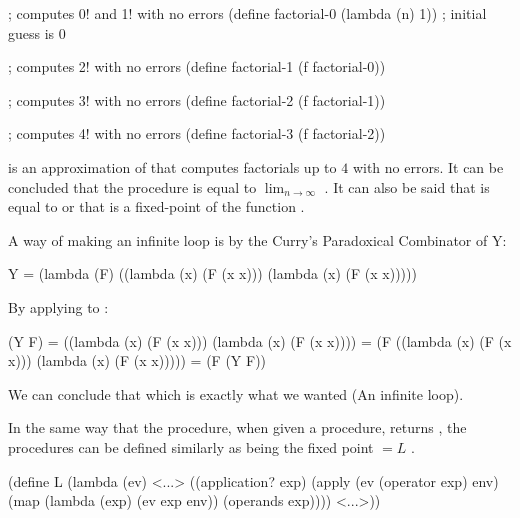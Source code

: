   \begin{code}
; computes 0! and 1! with no errors
(define factorial-0 (lambda (n) 1)) ; initial guess is 0

; computes 2! with no errors
(define factorial-1 (f factorial-0))

; computes 3! with no errors
(define factorial-2 (f factorial-1))

; computes 4! with no errors
(define factorial-3 (f factorial-2))
  \end{code}

   is an approximation of  that computes factorials up to $4$ with no errors. It can be concluded that the procedure  is equal to $\lim_{n \to \infty}$ . It can also be said that  is equal to  or that  is a fixed-point of the function .

  A way of making an infinite loop is by the Curry's Paradoxical Combinator of Y:

  \begin{code}
Y = (lambda (F)
      ((lambda (x) (F (x x)))
       (lambda (x) (F (x x)))))
  \end{code}

  By applying  to :

  \begin{code}
(Y F) = ((lambda (x) (F (x x)))
         (lambda (x) (F (x x))))
      = (F ((lambda (x) (F (x x)))
            (lambda (x) (F (x x)))))
      = (F (Y F))
  \end{code}

  We can conclude that  which is exactly what we wanted (An infinite loop).


  In the same way that the  procedure, when given a  procedure, returns , the procedures  can be defined similarly as being the fixed point  $= L$ .

  \begin{code}
(define L
  (lambda (ev)
    <...>
    ((application? exp) (apply (ev (operator exp) env)
                               (map (lambda (exp) (ev exp env)) (operands exp))))
    <...>))
  \end{code}

